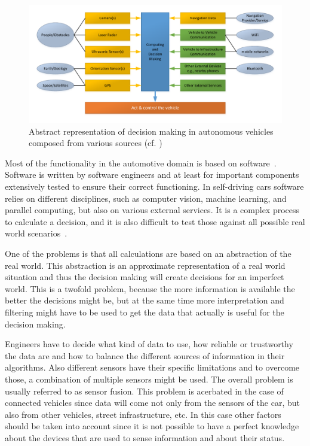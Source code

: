 \begin{figure}
\centering
\includegraphics[width=1\linewidth]{Figures/Figures_V20171008_DecisionMaking.pdf}
\caption{Abstract representation of decision making in autonomous vehicles composed from various sources (cf.  \cite{EarthImagingJournalEIJ:RemoteSensingSatelliteImages2012,Waldrop2015,Waymo2017technology,Tesla2016_upgrade})}
\label{fig:DecisionMaking}
\end{figure}

Most of the functionality in the automotive domain is based on software~\cite{Broy2007}. Software is written by software engineers and at least for important components extensively tested to ensure their correct functioning. In self-driving cars software relies on different disciplines, such as computer vision, machine learning, and parallel computing, but also on various external services. It is a complex process to calculate a decision, and it is also difficult to test those against all possible real world scenarios~\cite{Waldrop2015}. 

One of the problems is that all calculations are based on an abstraction of the real world. This abstraction is an approximate representation of a real world situation and thus the decision making will create decisions for an imperfect world. This is a twofold problem, because the more information is available the better the decisions might be, but at the same time more interpretation and filtering might have to be used to get the data that actually is useful for the decision making. 

Engineers have to decide what kind of data to use, how reliable or trustworthy the data are and how to balance the different sources of information in their algorithms. Also different sensors have their specific limitations and to overcome those, a combination of multiple sensors might be used. The overall problem is usually referred to as sensor fusion. This problem is acerbated in the case of connected vehicles since data will come not only from the sensors of the car, but also from other vehicles, street infrastructure, etc. In this case other factors should be taken into account since it is not possible to have a perfect knowledge about the devices that are used to sense information and about their status.

